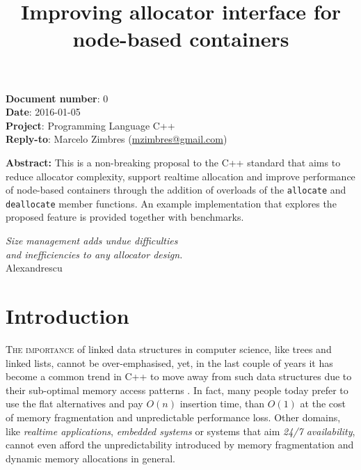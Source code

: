 \documentclass[11pt]{article}
\begin{document}
\date{}
\title{\bf Improving allocator interface for node-based containers}

\vspace{-2cm}
\maketitle


\noindent
{\bf Document number}:  0 \\
{\bf Date}:  2016-01-05 \\
{\bf Project}: Programming Language C++ \\
{\bf Reply-to}: Marcelo Zimbres (\href{mailto:mzimbres@gmail.com}{mzimbres@gmail.com}) 

\vspace{1cm}

\noindent
{\bf Abstract: }This is a non-breaking proposal to the C++ standard
that aims to reduce allocator complexity, support realtime allocation
and improve performance of node-based containers through the addition
of overloads of the \texttt{allocate} and \texttt{deallocate} member
functions. An example implementation that explores the proposed
feature is provided together with benchmarks.

\tableofcontents

\vfill
\begin{flushright}
\noindent
{\it Size management adds undue difficulties \\
     and inefficiencies to any allocator design.} \\
Alexandrescu \\
\medskip
{\it }
\end{flushright}
\medskip

\section{Introduction}
\textsc{The importance} of linked data structures in computer science,
like trees and linked lists, cannot be over-emphasised, yet, in the
last couple of years it has become a common trend in C++ to move away
from such data structures due to their sub-optimal memory access
patterns \cite{chandler, meyers}.  In fact, many people today prefer to use the flat
alternatives and pay $O(n)$ insertion time, than $O(1)$ at the cost of
memory fragmentation and unpredictable performance loss. Other
domains, like {\it realtime applications}, {\it embedded systems} or
systems that aim {\it 24/7 availability}, cannot even afford the
unpredictability introduced by memory fragmentation and dynamic
memory allocations in general.
\end{document}

